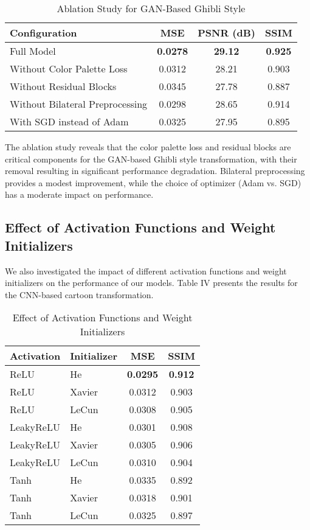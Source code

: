 \documentclass[conference]{IEEEtran}
\begin{document}
\begin{table}[!t]
\caption{Ablation Study for GAN-Based Ghibli Style}
\label{table_ablation}
\centering
\begin{tabular}{lccc}
\toprule
\textbf{Configuration} & \textbf{MSE} & \textbf{PSNR (dB)} & \textbf{SSIM} \\
\midrule
Full Model & \textbf{0.0278} & \textbf{29.12} & \textbf{0.925} \\
Without Color Palette Loss & 0.0312 & 28.21 & 0.903 \\
Without Residual Blocks & 0.0345 & 27.78 & 0.887 \\
Without Bilateral Preprocessing & 0.0298 & 28.65 & 0.914 \\
With SGD instead of Adam & 0.0325 & 27.95 & 0.895 \\
\bottomrule
\end{tabular}
\end{table}

The ablation study reveals that the color palette loss and residual blocks are critical components for the GAN-based Ghibli style transformation, with their removal resulting in significant performance degradation. Bilateral preprocessing provides a modest improvement, while the choice of optimizer (Adam vs. SGD) has a moderate impact on performance.

\subsection{Effect of Activation Functions and Weight Initializers}
We also investigated the impact of different activation functions and weight initializers on the performance of our models. Table IV presents the results for the CNN-based cartoon transformation.

\begin{table}[!t]
\caption{Effect of Activation Functions and Weight Initializers}
\label{table_activations}
\centering
\begin{tabular}{llcc}
\toprule
\textbf{Activation} & \textbf{Initializer} & \textbf{MSE} & \textbf{SSIM} \\
\midrule
ReLU & He & \textbf{0.0295} & \textbf{0.912} \\
ReLU & Xavier & 0.0312 & 0.903 \\
ReLU & LeCun & 0.0308 & 0.905 \\
LeakyReLU & He & 0.0301 & 0.908 \\
LeakyReLU & Xavier & 0.0305 & 0.906 \\
LeakyReLU & LeCun & 0.0310 & 0.904 \\
Tanh & He & 0.0335 & 0.892 \\
Tanh & Xavier & 0.0318 & 0.901 \\
Tanh & LeCun & 0.0325 & 0.897 \\
\bottomrule
\end{tabular}
\end{table}
\end{document}
